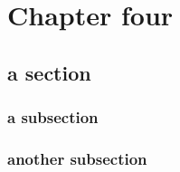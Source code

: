 \chapter{Chapter four}



\lipsum

\section{a section}

\lipsum

\subsection{a subsection}

\lipsum

\subsection{another subsection}

\lipsum
